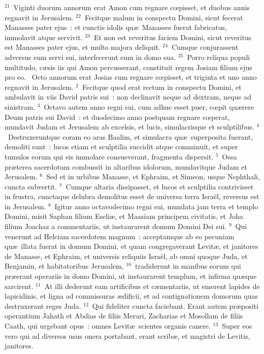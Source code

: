 ${}^{21}$~Viginti duorum annorum erat Amon cum regnare cœpisset, et duobus annis regnavit in Jerusalem.
${}^{22}$~Fecitque malum in conspectu Domini, sicut fecerat Manasses pater ejus~: et cunctis idolis qu\ae\ Manasses fuerat fabricatus, immolavit atque servivit.
${}^{23}$~Et non est reveritus faciem Domini, sicut reveritus est Manasses pater ejus, et multo majora deliquit.
${}^{24}$~Cumque conjurassent adversus eum servi sui, interfecerunt eum in domo sua.
${}^{25}$~Porro reliqua populi multitudo, c\ae sis iis qui Amon percusserant, constituit regem Josiam filium ejus pro eo.
~\lettrine[lines=10,image=true,loversize=0.05,lraise=-0.03]{O}{}cto annorum erat Josias cum regnare cœpisset, et triginta et uno anno regnavit in Jerusalem.
${}^{2}$~Fecitque quod erat rectum in conspectu Domini, et ambulavit in viis David patris sui~: non declinavit neque ad dextram, neque ad sinistram.
${}^{3}$~Octavo autem anno regni sui, cum adhuc esset puer, cœpit qu\ae rere Deum patris sui David~: et duodecimo anno postquam regnare cœperat, mundavit Judam et Jerusalem ab excelsis, et lucis, simulacrisque et sculptilibus.
${}^{4}$~Destruxeruntque coram eo aras Baalim, et simulacra qu\ae\ superposita fuerant, demoliti sunt~: lucos etiam et sculptilia succidit atque comminuit, et super tumulos eorum qui eis immolare consueverant, fragmenta dispersit.
${}^{5}$~Ossa pr\ae terea sacerdotum combussit in altaribus idolorum, mundavitque Judam et Jerusalem.
${}^{6}$~Sed et in urbibus Manasse, et Ephraim, et Simeon, usque Nephthali, cuncta subvertit.
${}^{7}$~Cumque altaria dissipasset, et lucos et sculptilia contrivisset in frustra, cunctaque delubra demolitus esset de universa terra Isra\"el, reversus est in Jerusalem.
${}^{8}$~Igitur anno octavodecimo regni sui, mundata jam terra et templo Domini, misit Saphan filium Eseli\ae , et Maasiam principem civitatis, et Joha filium Joachaz a commentariis, ut instaurarent domum Domini Dei sui.
${}^{9}$~Qui venerunt ad Helciam sacerdotem magnum~: acceptamque ab eo pecuniam qu\ae\ illata fuerat in domum Domini, et quam congregaverant Levit\ae , et janitores de Manasse, et Ephraim, et universis reliquiis Isra\"el, ab omni quoque Juda, et Benjamin, et habitatoribus Jerusalem,
${}^{10}$~tradiderunt in manibus eorum qui pr\ae erant operariis in domo Domini, ut instaurarent templum, et infirma qu\ae que sarcirent.
${}^{11}$~At illi dederunt eam artificibus et c\ae mentariis, ut emerent lapides de lapicidinis, et ligna ad commissuras \ae dificii, et ad contignationem domorum quas destruxerant reges Juda.
${}^{12}$~Qui fideliter cuncta faciebant. Erant autem pr\ae positi operantium Jahath et Abdias de filiis Merari, Zacharias et Mosollam de filiis Caath, qui urgebant opus~: omnes Levit\ae\ scientes organis canere.
${}^{13}$~Super eos vero qui ad diversos usus onera portabant, erant scrib\ae , et magistri de Levitis, janitores.


